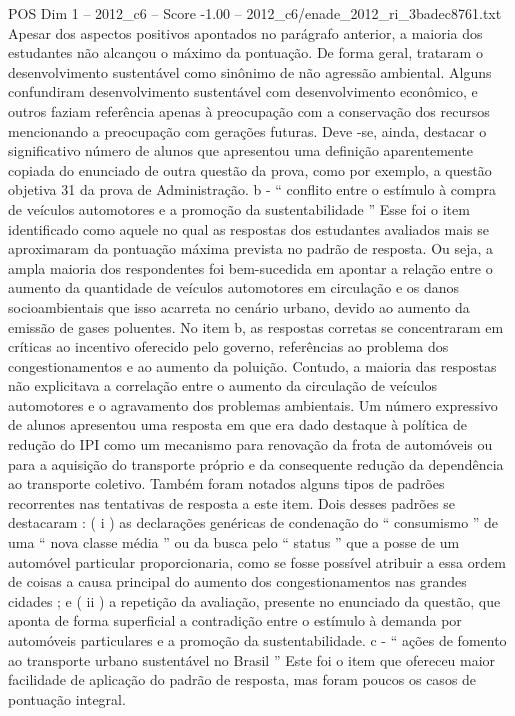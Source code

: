 \begin{textsample}{POS Dim 1 – 2012\_c6 – Score -1.00 – 2012\_c6/enade\_2012\_ri\_3badec8761.txt}
Apesar dos aspectos positivos apontados no parágrafo anterior, a maioria dos estudantes não alcançou o máximo da pontuação.
De forma geral, trataram o desenvolvimento sustentável como sinônimo de não agressão ambiental.
Alguns confundiram desenvolvimento sustentável com desenvolvimento econômico, e outros faziam referência apenas à preocupação com a conservação dos recursos mencionando a preocupação com gerações futuras.
Deve -se, ainda, destacar o significativo número de alunos que apresentou uma definição aparentemente copiada do enunciado de outra questão da prova, como por exemplo, a questão objetiva 31 da prova de Administração. b - “ conflito entre o estímulo à compra de veículos automotores e a promoção da sustentabilidade ” Esse foi o item identificado como aquele no qual as respostas dos estudantes avaliados mais se aproximaram da pontuação máxima prevista no padrão de resposta.
Ou seja, a ampla maioria dos respondentes foi bem-sucedida em apontar a relação entre o aumento da quantidade de veículos automotores em circulação e os danos socioambientais que isso acarreta no cenário urbano, devido ao aumento da emissão de gases poluentes.
No item b, as respostas corretas se concentraram em críticas ao incentivo oferecido pelo governo, referências ao problema dos congestionamentos e ao aumento da poluição.
Contudo, a maioria das respostas não explicitava a correlação entre o aumento da circulação de veículos automotores e o agravamento dos problemas ambientais.
Um número expressivo de alunos apresentou uma resposta em que era dado destaque à política de redução do IPI como um mecanismo para renovação da frota de automóveis ou para a aquisição do transporte próprio e da consequente redução da dependência ao transporte coletivo.
Também foram notados alguns tipos de padrões recorrentes nas tentativas de resposta a este item.
Dois desses padrões se destacaram : ( i ) as declarações genéricas de condenação do “ consumismo ” de uma “ nova classe média ” ou da busca pelo “ status ” que a posse de um automóvel particular proporcionaria, como se fosse possível atribuir a essa ordem de coisas a causa principal do aumento dos congestionamentos nas grandes cidades ; e ( ii ) a repetição da avaliação, presente no enunciado da questão, que aponta de forma superficial a contradição entre o estímulo à demanda por automóveis particulares e a promoção da sustentabilidade. c - “ ações de fomento ao transporte urbano sustentável no Brasil ” Este foi o item que ofereceu maior facilidade de aplicação do padrão de resposta, mas foram poucos os casos de pontuação integral.

\end{textsample}
